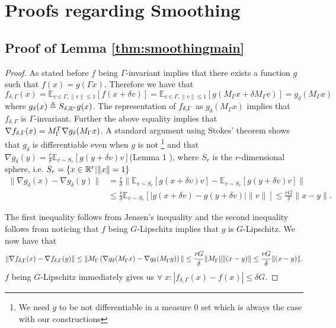 
\section{Proofs regarding Smoothing}
\subsection{Proof of Lemma \ref{thm:smoothingmain}}
\begin{proof}
  As stated before $f$ being $\Gamma$-invariant implies that there exists a function $g$ such that $f(x) = g(\Gamma x)$. Therefore we have that
  \[ f_{\delta, \Gamma}(x) = \mathbb{E}_{v \in \Gamma, \|v\| \leq 1}[ f(x + \delta v)] = \mathbb{E}_{v \in \Gamma, \|v\| \leq 1}[ g(M_{\Gamma} x + \delta M_{\Gamma} v)] = g_{\delta}(M_{\Gamma} x)\]
  where $g_{\delta}(x) \triangleq S_{\delta, {\mathbb R}^r} g(x)$. The representation of $f_{\delta,\Gamma}$ as $g_{\delta}(M_{\Gamma} x)$ implies that $f_{\delta, \Gamma}$ is $\Gamma$-invariant. Further the above equality implies that $\nabla f_{\delta,\Gamma}(x) = M_{\Gamma}^T \nabla g_{\delta}(M_{\Gamma} x)$. A standard argument using Stokes' theorem shows that $g_{\delta}$ is differentiable even when $g$ is not \footnote{We need $g$ to be not differentiable in a measure 0 set which is always the case with our constructions} and that $\nabla g_{\delta}(y) = \frac{r}{\delta}\mathbb{E}_{v \sim S_r} \left[ g(y + \delta v) v\right]$(Lemma 1 \cite{flaxman2005online}),
  where $S_r$ is the $r$-dimensional sphere, i.e. $S_r = \{x \in {\mathbb R}^r | \|x\| = 1\}$
  \begin{align*}
    \| \nabla g_{\delta}(x) - \nabla g_{\delta}(y) \| &=  \frac{r}{\delta}\|  \mathbb{E}_{v \sim S_r} \left[ g(x + \delta v) v\right] - \mathbb{E}_{v \sim S_r} \left[ g(y + \delta v) v\right] \|  \\ 
    &\leq   \frac{r}{\delta} \mathbb{E}_{v \sim S_r} \left[ | g(x + \delta v)  -  g(y + \delta v) | \| v \| \right] \leq \frac{rG}{\delta} \|x - y\|. 
  \end{align*}

  The first inequality follows from Jensen's inequality and the second inequality follows from noticing that $f$ being $G$-Lipschitz implies that $g$ is $G$-Lipschitz. We now have that 
  \[ \|\nabla f_{\delta,\Gamma}(x) - \nabla f_{\delta,\Gamma}(y)\| \leq \|M_{\Gamma} \left( \nabla g_{\delta}(M_{\Gamma} x) - \nabla g_{\delta}(M_{\Gamma} y) \right)\| \leq \frac{r G}{\delta} \| M_{\Gamma}\|\|(x - y)\| \leq \frac{r G}{\delta} \|(x - y)\|.\]
  $f$ being $G$-Lipschitz immediately gives us $\forall \;x: |f_{\delta,\Gamma}(x) - f(x)| \leq \delta G$.
\end{proof}


